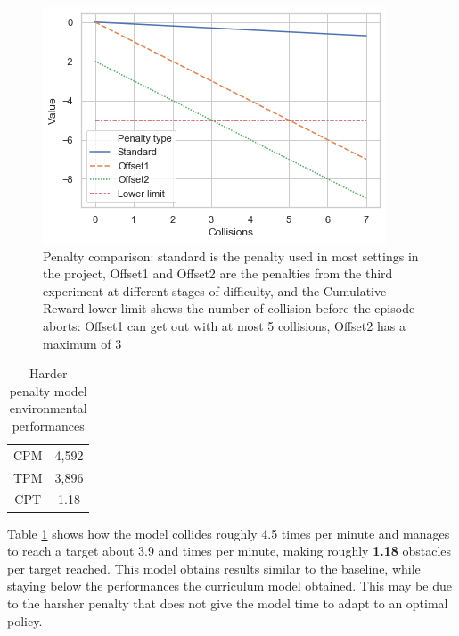 \documentclass{ifacconf}
\begin{document}
\begin{figure}[!hb]
\begin{center}
\includegraphics[width=\linewidth]{res/penalty.png} 
\caption{Penalty comparison: standard is the penalty used in most settings in the project, Offset1 and Offset2 are the penalties from the third experiment at different stages of difficulty, and the Cumulative Reward lower limit shows the number of collision before the episode aborts: Offset1 can get out with at most 5 collisions, Offset2 has a maximum of 3} 
\label{fig:penalty}
\end{center}
\end{figure}

\begin{table}[ht]
\centering
\caption{Harder penalty model environmental performances}
\label{tab:hardpen}
\begin{tabular}[t]{cc}
\hline
CPM&4,592\\
TPM&3,896\\
CPT&1.18\\
\hline
\end{tabular}
\end{table}%

Table \ref{tab:hardpen} shows how the model collides roughly 4.5 times per minute and manages to reach a target about 3.9 and times per minute, making roughly \textbf{1.18} obstacles per target reached. This model obtains results similar to the baseline, while staying below the performances the curriculum model obtained. This may be due to the harsher penalty that does not give the model time to adapt to an optimal policy.
\end{document}
